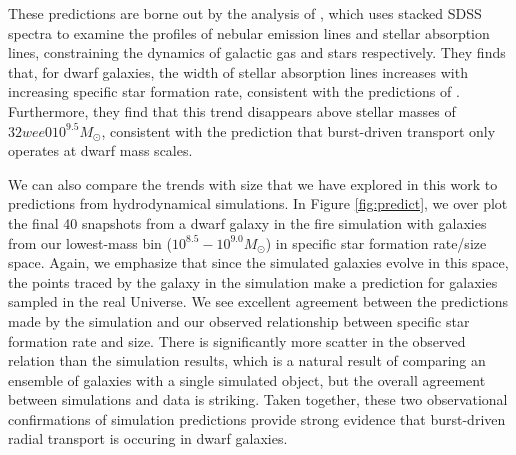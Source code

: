 \documentclass[iop]{emulateapj}
\begin{document}
These predictions are borne out by the analysis of \cite{Cicone16}, which uses stacked SDSS spectra to examine the profiles of nebular emission lines and stellar absorption lines, constraining the dynamics of galactic gas and stars respectively. They finds that, for dwarf galaxies, the width of stellar absorption lines increases with increasing specific star formation rate, consistent with the predictions of \cite{El-Badry17}. Furthermore, they find that this trend disappears above stellar masses of $32wee010^{9.5} M_{\odot}$, consistent with the prediction that burst-driven transport only operates at dwarf mass scales.

We can also compare the trends with size that we have explored in this work to predictions from hydrodynamical simulations. In Figure \ref{fig:predict}, we over plot the final 40 snapshots from a dwarf galaxy in the fire simulation with galaxies from our lowest-mass bin ($10^{8.5}-10^{9.0} M_{\odot}$) in specific star formation rate/size space. Again, we emphasize that since the simulated galaxies evolve in this space, the points traced by the galaxy in the simulation make a prediction for galaxies sampled in the real Universe. We see excellent agreement between the predictions made by the simulation and our observed relationship between specific star formation rate and size. There is significantly more scatter in the observed relation than the simulation results, which is a natural result of comparing an ensemble of galaxies with a single simulated object, but the overall agreement between simulations and data is striking. Taken together, these two observational confirmations of simulation predictions provide strong evidence that burst-driven radial transport is occuring in dwarf galaxies.
\end{document}
